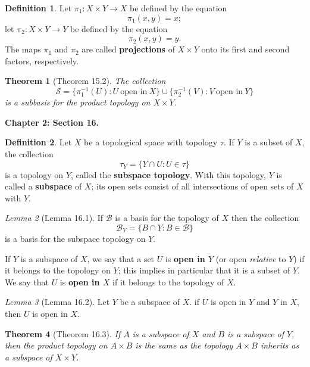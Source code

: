 \documentclass{article}
\newtheorem{theorem}{Theorem}
\theoremstyle{definition}
\newtheorem{definition}{Definition}[section]
\theoremstyle{remark}
\newtheorem{lemma}[theorem]{Lemma}
\begin{document}
    \begin{definition}
        Let $\pi_1: X\times Y\to X$ be defined by the equation
        \[ \pi_1(x,y) = x; \]
        let $\pi_2: X\times Y\to Y$ be defined by the equation
        \[ \pi_2(x,y) = y. \]
        The maps $\pi_1$ and $\pi_2$ are called \textbf{projections} of $X\times Y$ onto its first and second factors, respectively.
    \end{definition}

    \begin{theorem}[Theorem 15.2]
        The collection
        \[ \mathcal{S} = \{\pi_1^{-1}(U): U\:\text{open in}\: X\} \cup \{\pi_2^{-1}(V): V\:\text{open in}\:Y\} \]
        is a subbasis for the product topology on $X\times Y$.
    \end{theorem}

    \newpage

    \textbf{Chapter 2: Section 16.}
    \begin{definition}
        Let $X$ be a topological space with topology $\tau$. If $Y$ is a subset of $X$, the collection
        \[ \tau_Y = \{Y\cap U: U\in \tau\} \]
        is a topology on $Y$, called the \textbf{subspace topology}. With this topology, $Y$ is called a \textbf{subspace} of $X$;
        its open sets consist of all intersections of open sets of $X$ with $Y$.
    \end{definition}

    \begin{lemma}[Lemma 16.1]
        If $\mathcal{B}$ is a basis for the topology of $X$ then the collection
        \[ \mathcal{B}_Y = \{B\cap Y: B\in\mathcal{B}\} \]
        is a basis for the subspace topology on $Y$.
    \end{lemma}

    If $Y$ is a subspace of $X$, we say that a set $U$ is \textbf{open in $Y$} (or open \textit{relative} to $Y$) if it belongs
    to the topology on $Y$; this implies in particular that it is a subset of $Y$. We say that $U$ is \textbf{open in $X$} if it
    belongs to the topology of $X$.

    \begin{lemma}[Lemma 16.2]
        Let $Y$ be a subspace of $X$. if $U$ is open in $Y$ and $Y$ in $X$, then $U$ is open in $X$.
    \end{lemma}

    \begin{theorem}[Theorem 16.3]
        If $A$ is a subspace of $X$ and $B$ is a subspace of $Y$, then the product topology on $A\times B$ is the same as the topology
        $A\times B$ inherits as a subspace of $X\times Y$.
    \end{theorem}
\end{document}
